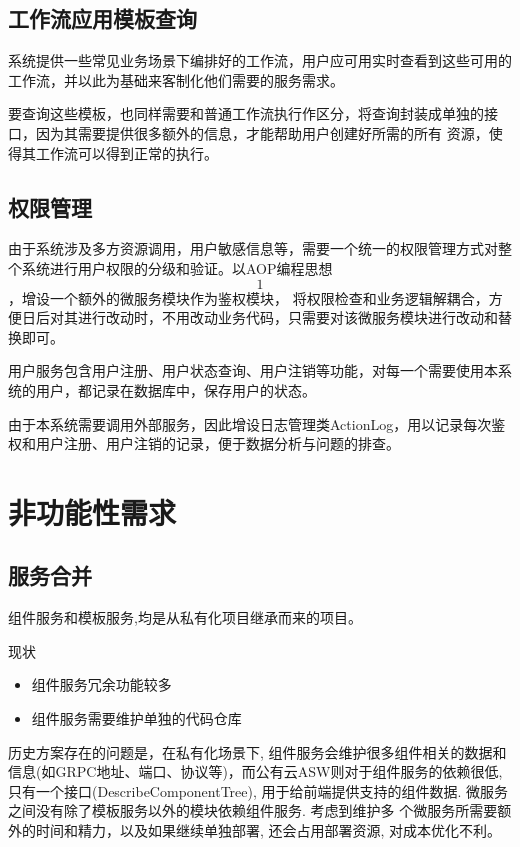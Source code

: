 \subsection{工作流应用模板查询}

系统提供一些常见业务场景下编排好的工作流，用户应可用实时查看到这些可用的工作流，并以此为基础来客制化他们需要的服务需求。

要查询这些模板，也同样需要和普通工作流执行作区分，将查询封装成单独的接口，因为其需要提供很多额外的信息，才能帮助用户创建好所需的所有
资源，使得其工作流可以得到正常的执行。

\subsection{权限管理}
由于系统涉及多方资源调用，用户敏感信息等，需要一个统一的权限管理方式对整个系统进行用户权限的分级和验证。以AOP编程思想\[1\]，增设一个额外的微服务模块作为鉴权模块，
将权限检查和业务逻辑解耦合，方便日后对其进行改动时，不用改动业务代码，只需要对该微服务模块进行改动和替换即可。


用户服务包含用户注册、用户状态查询、用户注销等功能，对每一个需要使用本系统的用户，都记录在数据库中，保存用户的状态。

由于本系统需要调用外部服务，因此增设日志管理类ActionLog，用以记录每次鉴权和用户注册、用户注销的记录，便于数据分析与问题的排查。


\section{非功能性需求}

\subsection{服务合并}

组件服务和模板服务,均是从私有化项目继承而来的项目。

现状
\begin{itemize}
    \item 组件服务冗余功能较多
    \item 组件服务需要维护单独的代码仓库
\end{itemize}

历史方案存在的问题是，在私有化场景下, 组件服务会维护很多组件相关的数据和信息(如GRPC地址、端口、协议等)，而公有云ASW则对于组件服务的依赖很低,
只有一个接口(DescribeComponentTree), 用于给前端提供支持的组件数据. 微服务之间没有除了模板服务以外的模块依赖组件服务. 考虑到维护多
个微服务所需要额外的时间和精力，以及如果继续单独部署, 还会占用部署资源, 对成本优化不利。

